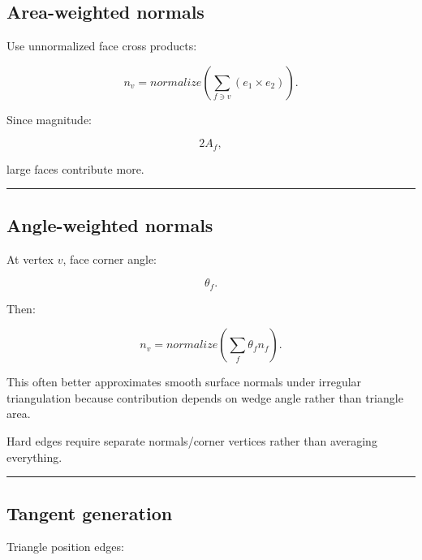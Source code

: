 \subsection{Area-weighted normals}\label{04-visual-computing-ii-ch041-area-weighted-normals}

\hypertarget{04-visual-computing-ii-ch041-area-weighted-normals}{}

Use unnormalized face cross products:

\[
\boxed{
n_v
=
normalize
\left(
\sum_{f\ni v}
(e_1\times e_2)
\right).
}
\]

Since magnitude:

\[
2A_f,
\]

large faces contribute more.

\begin{center}\rule{0.5\linewidth}{0.5pt}\end{center}

\subsection{Angle-weighted normals}\label{04-visual-computing-ii-ch041-angle-weighted-normals}

\hypertarget{04-visual-computing-ii-ch041-angle-weighted-normals}{}

At vertex \(v\), face corner angle:

\[
\theta_f.
\]

Then:

\[
\boxed{
n_v=
normalize
\left(
\sum_f
\theta_fn_f
\right).
}
\]

This often better approximates smooth surface normals under irregular triangulation because contribution depends on wedge angle rather than triangle area.

Hard edges require separate normals/corner vertices rather than averaging everything.

\begin{center}\rule{0.5\linewidth}{0.5pt}\end{center}

\subsection{Tangent generation}\label{04-visual-computing-ii-ch041-tangent-generation}

\hypertarget{04-visual-computing-ii-ch041-tangent-generation}{}

Triangle position edges:

